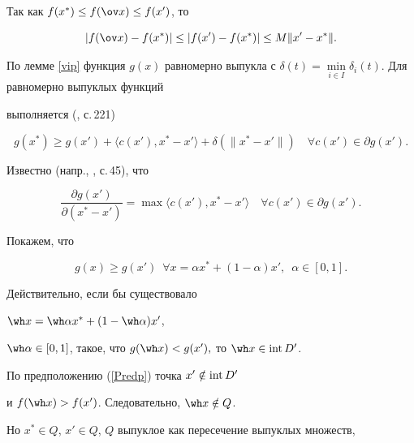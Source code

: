 \begin{pf}


Так как $f(x^*)\leq f(\ov x)\leq f(x')$, то


\begin{equation}\label{lip}


|f(\ov x)-f(x^*)|\leq |f(x')-f(x^*)|\leq M\|x'-x^*\|.


\end{equation}


По лемме \ref{vip} функция $g(x)$ равномерно выпукла с $\delta(t)=


\min\limits_{i\in I}\delta_i(t)$. Для равномерно выпуклых функций 


выполняется (\cite{Vas}, с.\,221)


\begin{equation} \label{st}


g(x^*)\geq g(x')+\langle c(x'),x^* -x' \rangle 


+\delta (\|x^* -x'\|)\quad \forall c(x')\in \partial g(x').


\end{equation}


Известно (напр., \cite{Psh}, с.\,45), что


\begin{equation*}


\frac{\partial g(x')}{\partial (x^* -x')}=


\max \langle c(x'),x^*-x'\rangle \quad \forall c(x')\in\partial g(x').


\end{equation*}


Покажем, что 


\begin{equation}\label{Ge}


g(x)\geq g(x')\ \; \forall x=\alpha x^*+(1-\alpha)x', \ \;\alpha\in[0,1].


\end{equation}


Действительно, если бы существовало 


$\wh x=\wh\alpha x^*+(1-\wh\alpha)x'$,


$\wh\alpha\in[0,1]$, такое, что $g(\wh x)<g(x'),$ то $\wh x\in \Int D'$. 


По предположению (\ref{Predp}) точка $x'\notin\operatorname{int} D'$ 


и $f(\wh x)>f(x')$. Следовательно, $\wh x\notin Q$.


Но $x^*\in Q$, $x'\in Q$, $Q$ выпуклое как пересечение выпуклых множеств, 



\end{pf}
